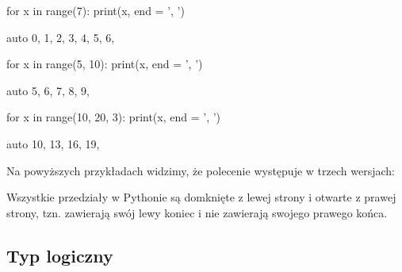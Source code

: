 \begin{CodeFrame}[python]{0.5\textwidth}
for x in range(7):
    print(x, end = ', ')
\end{CodeFrame}
\begin{CodeFrame}{auto}
0, 1, 2, 3, 4, 5, 6, 
\end{CodeFrame}

\begin{CodeFrame}[python]{0.5\textwidth}
for x in range(5, 10):
    print(x, end = ', ')
\end{CodeFrame}
\begin{CodeFrame}{auto}
5, 6, 7, 8, 9, 
\end{CodeFrame}

\begin{CodeFrame}[python]{0.5\textwidth}
for x in range(10, 20, 3):
    print(x, end = ', ')
\end{CodeFrame}
\begin{CodeFrame}{auto}
10, 13, 16, 19, 
\end{CodeFrame}

\noindent Na powyższych przykładach widzimy, że polecenie  występuje w trzech wersjach:

\begin{ProTip}{}
\normalsize Wszystkie przedziały w Pythonie są domknięte z lewej strony i otwarte z prawej strony,
tzn. zawierają swój lewy koniec i nie zawierają swojego prawego końca.
\end{ProTip}


\subsection{Typ logiczny}


